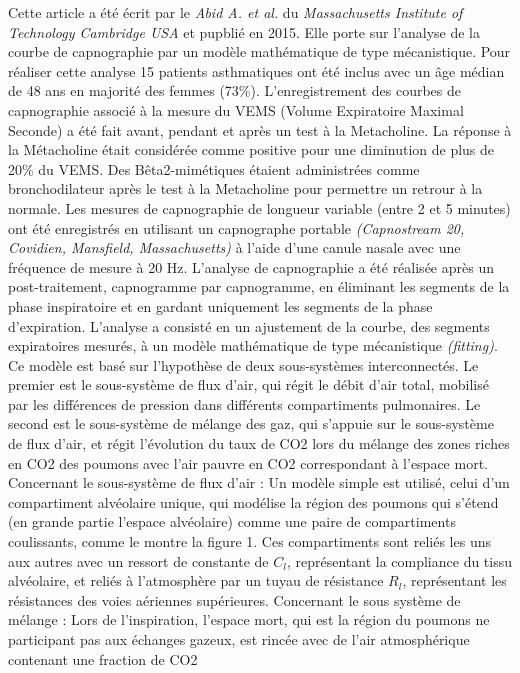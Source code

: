\documentclass[12pt,]{article}
\begin{document}
Cette article a été écrit par le \emph{Abid A. et al.} du
\emph{Massachusetts Institute of Technology Cambridge USA} et pupblié en
2015. Elle porte sur l'analyse de la courbe de capnographie par un
modèle mathématique de type mécanistique. Pour réaliser cette analyse 15
patients asthmatiques ont été inclus avec un âge médian de 48 ans en
majorité des femmes (73\%). L'enregistrement des courbes de capnographie
associé à la mesure du VEMS (Volume Expiratoire Maximal Seconde) a été
fait avant, pendant et après un test à la Metacholine. La réponse à la
Métacholine était considérée comme positive pour une diminution de plus
de 20\% du VEMS. Des Bêta2-mimétiques étaient administrées comme
bronchodilateur après le test à la Metacholine pour permettre un retrour
à la normale. Les mesures de capnographie de longueur variable (entre 2
et 5 minutes) ont été enregistrés en utilisant un capnographe portable
\emph{(Capnostream 20, Covidien, Mansfield, Massachusetts)} à l'aide
d'une canule nasale avec une fréquence de mesure à 20 Hz. L'analyse de
capnographie a été réalisée après un post-traitement, capnogramme par
capnogramme, en éliminant les segments de la phase inspiratoire et en
gardant uniquement les segments de la phase d'expiration. L'analyse a
consisté en un ajustement de la courbe, des segments expiratoires
mesurés, à un modèle mathématique de type mécanistique \emph{(fitting)}.
Ce modèle est basé sur l'hypothèse de deux sous-systèmes interconnectés.
Le premier est le sous-système de flux d'air, qui régit le débit d'air
total, mobilisé par les différences de pression dans différents
compartiments pulmonaires. Le second est le sous-système de mélange des
gaz, qui s'appuie sur le sous-système de flux d'air, et régit
l'évolution du taux de CO2 lors du mélange des zones riches en CO2 des
poumons avec l'air pauvre en CO2 correspondant à l'espace mort.
Concernant le sous-système de flux d'air : Un modèle simple est utilisé,
celui d'un compartiment alvéolaire unique, qui modélise la région des
poumons qui s'étend (en grande partie l'espace alvéolaire) comme une
paire de compartiments coulissants, comme le montre la figure 1. Ces
compartiments sont reliés les uns aux autres avec un ressort de
constante de \(C_{l}\), représentant la compliance du tissu alvéolaire,
et reliés à l'atmosphère par un tuyau de résistance \(R_{l}\),
représentant les résistances des voies aériennes supérieures. Concernant
le sous système de mélange : Lors de l'inspiration, l'espace mort, qui
est la région du poumons ne participant pas aux échanges gazeux, est
rincée avec de l'air atmosphérique contenant une fraction de CO2
\end{document}
